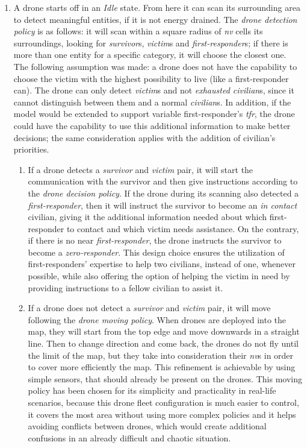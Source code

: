 \begin{enumerate}
	\item A drone starts off in an \textit{Idle} state. From here it can scan its surrounding area to detect meaningful entities, if it is not energy drained. The \textit{drone detection policy} is as follows: it will scan within a square radius of \textit{nv} cells its surroundings, looking for \textit{survivor}s, \textit{victim}s and \textit{first-responder}s; if there is more than one entity for a specific category, it will choose the closest one. The following assumption was made: a drone does not have the capability to choose the victim with the highest possibility to live (like a first-responder can). The drone can only detect \textit{victim}s and not \textit{exhausted civilian}s, since it cannot distinguish between them and a normal \textit{civilian}s. In addition, if the model would be extended to support variable first-responder's \textit{tfr}, the drone could have the capability to use this additional information to make better decisions; the same consideration applies with the addition of civilian's priorities.
	\begin{enumerate}
		\item If a drone detects a \textit{survivor} and \textit{victim} pair, it will start the communication with the survivor and then give instructions according to the \textit{drone decision policy}. If the drone during its scanning also detected a \textit{first-responder}, then it will instruct the survivor to become an \textit{in contact} civilian, giving it the additional information needed about which first-responder to contact and which victim needs assistance. On the contrary, if there is no near \textit{first-responder}, the drone instructs the survivor to become a \textit{zero-responder}. This design choice ensures the utilization of first-responders' expertise to help two civilians, instead of one, whenever possible, while also offering the option of helping the victim in need by providing instructions to a fellow civilian to assist it.
		
		\item If a drone does not detect a \textit{survivor} and \textit{victim} pair, it will move following the \textit{drone moving policy}. When drones are deployed into the map, they will start from the top edge and move downwards in a straight line. Then to change direction and come back, the drones do not fly until the limit of the map, but they take into consideration their \textit{nv}s in order to cover more efficiently the map. This refinement is achievable by using simple sensors, that should already be present on the drones. This moving policy has been chosen for its simplicity and practicality in real-life scenarios, because this drone fleet configuration is much easier to control, it covers the most area without using more complex policies and it helps avoiding conflicts between drones, which would create additional confusions in an already difficult and chaotic situation.
	\end{enumerate}
\end{enumerate}
